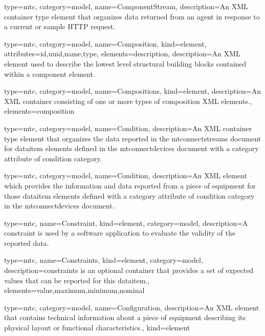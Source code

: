{
  type=mtc,
  category=model,
  name={ComponentStream},
  description={An XML container type element that organizes data returned from an \gls{agent} in response to a current or sample HTTP request.} 
}


{
  type=mtc,
  category=model,
  name={Composition},
  kind={element},
  attributes={\gls{id},\gls{uuid},\gls{name},\gls{type}},
  elements={\gls{description}},
  description={An XML element used to describe the lowest level structural building blocks contained within a \gls{component} element.}
}


{
  type=mtc,
  category=model,
  name={Compositions},
  kind={element},
  description={An XML container consisting of one or more types of \gls{composition} XML elements.},
  elements={\gls{composition}}
}


{
  type=mtc,
  category=model,
  name={Condition},
  description={An XML container type element that organizes the data reported in the \glspl{mtconnectstream} document for \gls{dataitem} elements defined in the \glspl{mtconnectdevice} document with a \gls{category} attribute of \gls{condition category}.}
}

{
  type=mtc,
  category=model,
  name={Condition},
  description={An XML element which provides the information and data reported from a piece of equipment for those \gls{dataitem} elements defined with a \gls{category} attribute of \gls{condition category} in the \glspl{mtconnectdevice} document.}
}


{
  type=mtc,
  name={Constraint},
  kind={element},
  category=model,
  description={A \gls{constraint} is used by a software application to evaluate the validity of the reported data.}
}

{
  type=mtc,
  name={Constraints},
  kind={element},
  category=model,
  description={\gls{constraints} is an optional container that provides a set of expected values that can be reported for this \gls{dataitem}.},
  elements={\gls{value},\gls{maximum},\gls{minimum},\gls{nominal}}
}


{
  type=mtc,
  category=model,
  name={Configuration},
  description={An XML element that contains technical information about a piece of equipment describing its physical layout or functional characteristics.},
  kind={element}
}



